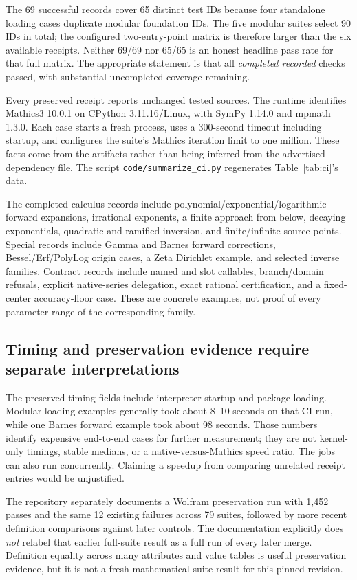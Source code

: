 \documentclass[11pt,letterpaper]{article}
\newcommand{\pathcode}[1]{\nolinkurl{#1}}
\begin{document}
The 69 successful records cover 65 distinct test IDs because four standalone loading cases duplicate modular foundation IDs. The five modular suites select 90 IDs in total; the configured two-entry-point matrix is therefore larger than the six available receipts. Neither 69/69 nor 65/65 is an honest headline pass rate for that full matrix. The appropriate statement is that all \emph{completed recorded} checks passed, with substantial uncompleted coverage remaining.

Every preserved receipt reports unchanged tested sources. The runtime identifies Mathics3 10.0.1 on CPython 3.11.16/Linux, with SymPy 1.14.0 and mpmath 1.3.0. Each case starts a fresh process, uses a 300-second timeout including startup, and configures the suite's Mathics iteration limit to one million. These facts come from the artifacts rather than being inferred from the advertised dependency file. The script \pathcode{code/summarize_ci.py} regenerates Table~\ref{tab:ci}'s data.

The completed calculus records include polynomial/exponential/logarithmic forward expansions, irrational exponents, a finite approach from below, decaying exponentials, quadratic and ramified inversion, and finite/infinite source points. Special records include Gamma and Barnes forward corrections, Bessel/Erf/PolyLog origin cases, a Zeta Dirichlet example, and selected inverse families. Contract records include named and slot callables, branch/domain refusals, explicit native-series delegation, exact rational certification, and a fixed-center accuracy-floor case. These are concrete examples, not proof of every parameter range of the corresponding family.

\subsection{Timing and preservation evidence require separate interpretations}
The preserved timing fields include interpreter startup and package loading. Modular loading examples generally took about 8--10 seconds on that CI run, while one Barnes forward example took about 98 seconds. Those numbers identify expensive end-to-end cases for further measurement; they are not kernel-only timings, stable medians, or a native-versus-Mathics speed ratio. The jobs can also run concurrently. Claiming a speedup from comparing unrelated receipt entries would be unjustified.

The repository separately documents a Wolfram preservation run with 1,452 passes and the same 12 existing failures across 79 suites, followed by more recent definition comparisons against later controls. The documentation explicitly does \emph{not} relabel that earlier full-suite result as a full run of every later merge. Definition equality across many attributes and value tables is useful preservation evidence, but it is not a fresh mathematical suite result for this pinned revision.\cite{mathicsdocs}
\end{document}
